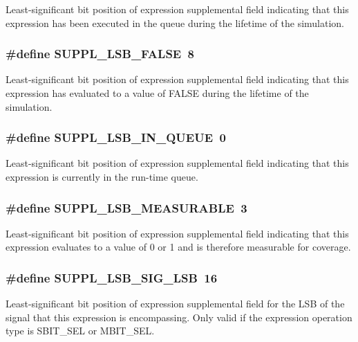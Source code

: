 Least-significant bit position of expression supplemental field indicating that this expression has been executed in the queue during the lifetime of the simulation. 
\subsubsection{\setlength{\rightskip}{0pt plus 5cm}\#define SUPPL\_\-LSB\_\-FALSE\ 8}\label{group__expr__suppl_a4}


Least-significant bit position of expression supplemental field indicating that this expression has evaluated to a value of FALSE during the lifetime of the simulation. 
\subsubsection{\setlength{\rightskip}{0pt plus 5cm}\#define SUPPL\_\-LSB\_\-IN\_\-QUEUE\ 0}\label{group__expr__suppl_a0}


Least-significant bit position of expression supplemental field indicating that this expression is currently in the run-time queue. 
\subsubsection{\setlength{\rightskip}{0pt plus 5cm}\#define SUPPL\_\-LSB\_\-MEASURABLE\ 3}\label{group__expr__suppl_a3}


Least-significant bit position of expression supplemental field indicating that this expression evaluates to a value of 0 or 1 and is therefore measurable for coverage. 
\subsubsection{\setlength{\rightskip}{0pt plus 5cm}\#define SUPPL\_\-LSB\_\-SIG\_\-LSB\ 16}\label{group__expr__suppl_a6}


Least-significant bit position of expression supplemental field for the LSB of the signal that this expression is encompassing. Only valid if the expression operation type is SBIT\_\-SEL or MBIT\_\-SEL. 
